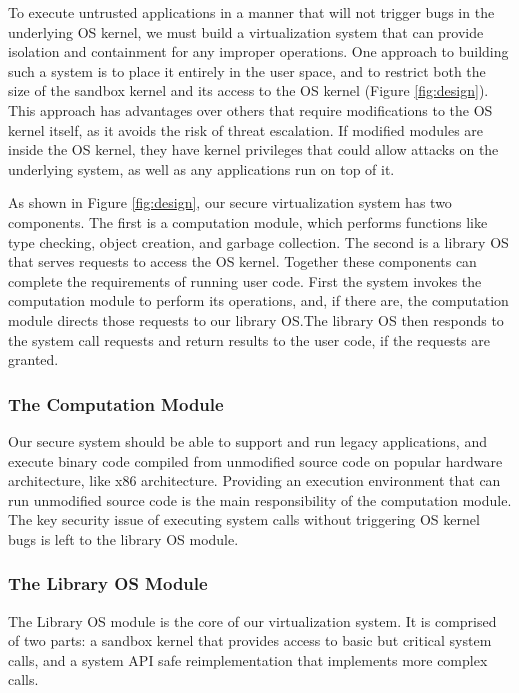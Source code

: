 To execute untrusted applications in a manner that will not trigger bugs
in the underlying OS kernel, %
we must build a virtualization system that can provide isolation and
containment for any improper operations.
One approach to building such a system is to place it entirely in the user space,
and to restrict both the size of the sandbox kernel and its access to the
OS kernel (Figure \ref{fig:design}).
This approach has advantages over others that require modifications to
the OS kernel itself, as it avoids the risk of threat escalation. If modified modules
are inside the OS kernel, they have kernel privileges that could allow attacks
on the underlying system, as well as any applications run on top of it.

As shown in Figure \ref{fig:design}, our secure virtualization system
has two components.
The first is a computation module, which performs functions like type checking,
object creation, and garbage collection. The second is a library OS that
serves requests to access the OS kernel.
Together these components can complete the requirements of running user code.
First the system invokes the computation module to perform its operations,
and, if there are, the computation module directs those requests to our
library OS.The library OS then responds to the system call requests and
return results to the user code, if the requests are granted.

\subsubsection{The Computation Module}

Our secure system should be able to support and run legacy applications,
and execute binary code compiled from unmodified source code on popular hardware architecture,
like x86 architecture. Providing an execution environment that can run unmodified source code is
the main responsibility of the computation module. The key security issue of executing system calls
without triggering OS kernel bugs is left to the library OS module.

\subsubsection{The Library OS Module}

The Library OS module is the core of our virtualization system. It is comprised
of two parts: a sandbox kernel that provides access to basic but critical
system calls, and a system API safe reimplementation that implements more
complex calls. 


